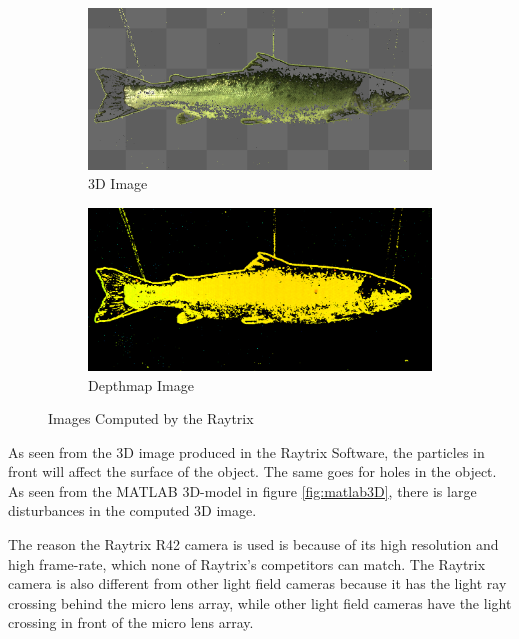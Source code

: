 \begin{figure}[h]
    \medskip
    \begin{subfigure}{0.49\textwidth}
        \includegraphics[width=\linewidth]{images/hardware/raytrix_3D_image}
        \caption{3D Image} 
        \label{fig:3d_image}
    \end{subfigure}\hspace*{\fill}
    \begin{subfigure}{0.49\textwidth}
        \includegraphics[width=\linewidth]{images/hardware/raytrix_depthmap_image}
        \caption{Depthmap Image} 
        \label{fig:depthmap}
    \end{subfigure}
    \caption{Images Computed by the Raytrix} 
    \label{fig:raytrix_captures}
\end{figure}

As seen from the 3D image produced in the Raytrix Software, the particles in front will affect the surface of the object. The same goes for holes in the object. As seen from the MATLAB 3D-model in figure \ref{fig:matlab3D}, there is large disturbances in the computed 3D image.

The reason the Raytrix R42 camera is used is because of its high resolution and high frame-rate, which none of Raytrix's competitors can match. The Raytrix camera is also different from other light field cameras because it has the light ray crossing behind the micro lens array, while other light field cameras have the light crossing in front of the micro lens array.\cite{article:stereo_vs_plenoptic}

